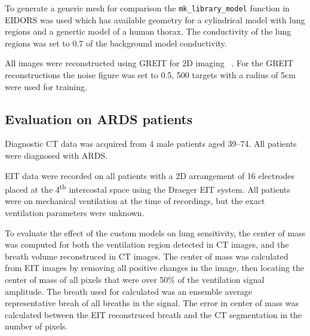 To generate a generic mesh for comparison the \verb!mk_library_model! function in 
EIDORS was used which has available geometry for a cylindrical model with lung regions
and a genertic model of a human thorax. The conductivity of the lung regions was set to 
0.7 of the background model conductivity.

All images were reconstructed using GREIT for 2D
imaging ~\parencite{adler_greit_2009}. For the GREIT 
reconstructions the noise figure was set to 0.5, 
500 targets with a radius of 5cm were used for training.

\subsection{Evaluation on ARDS patients} \label{sec:gi-scores}

Diagnostic CT data was acquired from 4 male patients aged 39--74. 
All patients were diagnosed with ARDS.

EIT data were recorded on all patients
with a 2D arrangement of 16 electrodes placed at the 
4\textsuperscript{th} intercostal space using the 
Draeger EIT system. 
All patients were on mechanical ventilation
at the time of recordings, but the exact 
ventilation parameters were unknown.

To evaluate the effect of the custom models on lung sensitivity,
the center of mass was computed for both the ventilation region detected in 
CT images, and the breath volume reconstruced in CT images. 
The center of mass was calculated from EIT images by removing all 
positive changes in the image, then locating the center of mass 
of all pixels that were over 50\% of the ventilation signal amplitude. 
The breath used for calculated was an ensemble average representative breah 
of all breaths in the signal.
The error in center of mass was calculated between the EIT reconstruced breath 
and the CT segmentation in the number of pixels.

%

